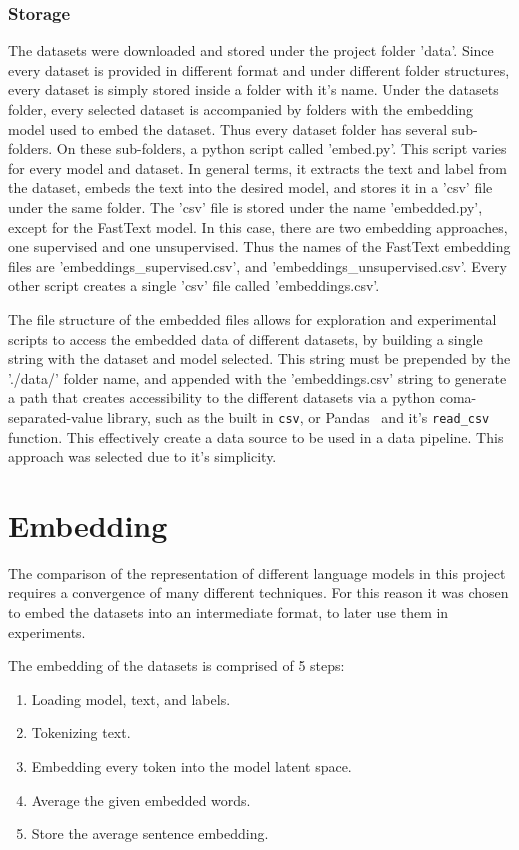 \subsubsection{Storage}\label{subs:Storage}
The datasets were downloaded and stored under the project folder 'data'. Since every dataset is provided in different format and under different folder structures, every dataset is simply stored inside a folder with it's name.
Under the datasets folder, every selected dataset is accompanied by folders with the embedding model used to embed the dataset. Thus every dataset folder has several sub-folders. On these sub-folders, a python script called 'embed.py'. This script varies for every model and dataset. In general terms, it extracts the text and label from the dataset, embeds the text into the desired model, and stores it in a 'csv' file under the same folder.
The 'csv' file is stored under the name 'embedded.py', except for the FastText model. In this case, there are two embedding approaches, one supervised and one unsupervised. Thus the names of the FastText embedding files are 'embeddings_supervised.csv', and 'embeddings_unsupervised.csv'. Every other script creates a single 'csv' file called 'embeddings.csv'.

The file structure of the embedded files allows for exploration and experimental scripts to access the embedded data of different datasets, by building a single string with the dataset and model selected. This string must be prepended by the './data/' folder name, and appended with the 'embeddings.csv' string to generate a path that creates accessibility to the different datasets via a python coma-separated-value library, such as the built in \lstinline{csv}, or Pandas~\cite{reback2020pandas} and it's \lstinline{read_csv} function. This effectively create a data source to be used in a data pipeline. This approach was selected due to it's simplicity.

\section{Embedding}\label{sec:Embedding}
The comparison of the representation of different language models in this project requires a convergence of many different techniques. For this reason it was chosen to embed the datasets into an intermediate format, to later use them in experiments.

The embedding of the datasets is comprised of 5 steps:

\begin{enumerate}
  \item Loading model, text, and labels.
  \item Tokenizing text.
  \item Embedding every token into the model latent space.
  \item Average the given embedded words.
  \item Store the average sentence embedding.
\end{enumerate}

